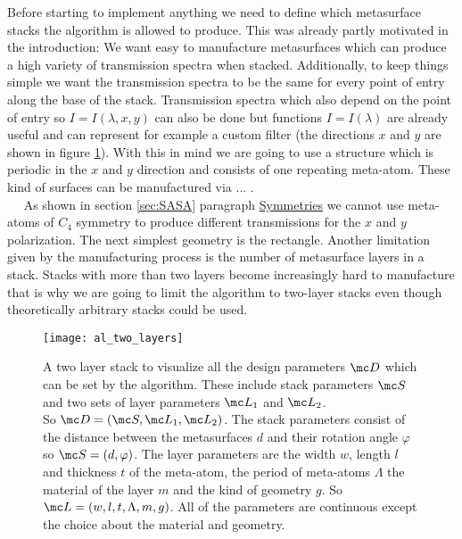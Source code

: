 Before starting to implement anything we need to define which metasurface stacks the algorithm is allowed to produce. This was already partly motivated in the introduction: We want easy to manufacture metasurfaces which can produce a high variety of transmission spectra when stacked. Additionally, to keep things simple we want the transmission spectra to be the same for every point of entry along the base of the stack. Transmission spectra which also depend on the point of entry so $I = I(\lambda,x,y)$ can also be done \cite{Mueller2017} but functions $I = I(\lambda)$ are already useful and can represent for example a custom filter (the directions $x$ and $y$ are shown in figure \ref{fig:al:two_layers}).
With this in mind we are going to use a structure which is periodic in the
$x$ and $y$ direction and consists of one repeating meta-atom. These kind of surfaces can be manufactured via ... .
\\

$\quad$ As shown in section \ref{sec:SASA} paragraph \hyperref[sec:symmetries]{Symmetries} we cannot use meta-atoms of $C_4$ symmetry to produce different transmissions for the $x$ and $y$ polarization. The next simplest geometry is the rectangle. Another limitation given by the manufacturing process is the number of metasurface layers in a stack. Stacks with more than two layers become increasingly hard to manufacture that is why we are going to limit the algorithm to two-layer stacks even though theoretically arbitrary stacks could be used.
\\

\begin{figure}[H]
    \centering
    \texttt{[image: al\_two\_layers]}
    \caption{A two layer stack to visualize all the design parameters
    $\mc D$ which can be set by the algorithm. These include stack parameters $\mc S$ and two sets of layer parameters $\mc L_1$ and $\mc L_2$.\\
    So $\mc D = (\mc S, \mc L_1, \mc L_2)$. The stack parameters consist of the distance between the metasurfaces $d$ and their rotation angle $\varphi$ so $\mc S = (d, \varphi)$. The layer parameters are the width $w$, length $l$ and thickness $t$ of the meta-atom, the period of meta-atoms $\Lambda$ the  material of the layer $m$ and the kind of geometry $g$. So $\mc L = (w,l,t,\Lambda,m,g)$. All of the parameters are continuous except the choice about the material and geometry.}
    \label{fig:al:two_layers}
\end{figure}


